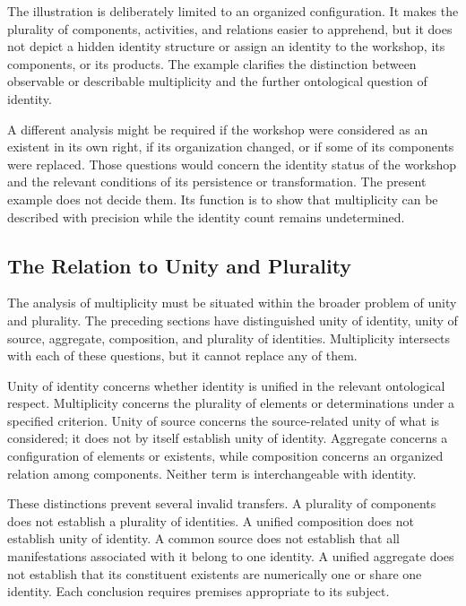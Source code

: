 

The illustration is deliberately limited to
an organized configuration. It makes the
plurality of components, activities, and
relations easier to apprehend, but it does
not depict a hidden identity structure or
assign an identity to the workshop, its
components, or its products. The example
clarifies the distinction between observable
or describable multiplicity and the further
ontological question of identity.

A different analysis might be required if
the workshop were considered as an existent
in its own right, if its organization changed,
or if some of its components were replaced.
Those questions would concern the identity
status of the workshop and the relevant
conditions of its persistence or transformation.
The present example does not decide them.
Its function is to show that multiplicity
can be described with precision while the
identity count remains undetermined.

\subsection{The Relation to Unity and Plurality}

The analysis of multiplicity must be situated
within the broader problem of unity and plurality.
The preceding sections have distinguished
unity of identity, unity of source, aggregate,
composition, and plurality of identities.
Multiplicity intersects with each of these
questions, but it cannot replace any of them.

Unity of identity concerns whether identity
is unified in the relevant ontological respect.
Multiplicity concerns the plurality of
elements or determinations under a specified
criterion. Unity of source concerns the
source-related unity of what is considered;
it does not by itself establish unity of
identity. Aggregate concerns a configuration
of elements or existents, while composition
concerns an organized relation among
components. Neither term is interchangeable
with identity.

These distinctions prevent several invalid
transfers. A plurality of components does
not establish a plurality of identities.
A unified composition does not establish
unity of identity. A common source does not
establish that all manifestations associated
with it belong to one identity. A unified
aggregate does not establish that its
constituent existents are numerically one
or share one identity. Each conclusion
requires premises appropriate to its subject.

